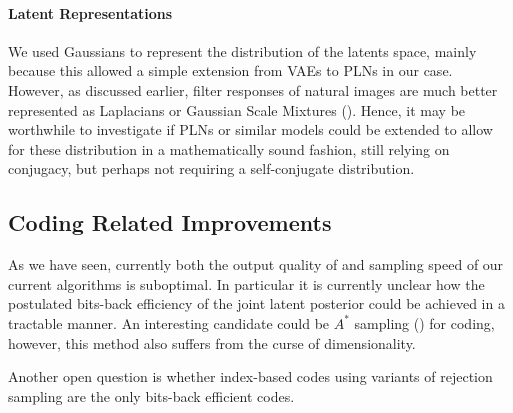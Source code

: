 \paragraph{Latent Representations}
We used Gaussians to represent the distribution of the latents space, mainly
because this allowed a simple extension from VAEs to PLNs in our case. However,
as discussed earlier, filter responses of natural images are much better
represented as Laplacians or Gaussian Scale Mixtures (\cite{portilla2003image}).
Hence, it may be worthwhile to investigate if PLNs or similar models could be
extended to allow for these distribution in a mathematically sound fashion,
still relying on conjugacy, but perhaps not requiring a self-conjugate distribution.

\subsection{Coding Related Improvements}
\par
As we have seen, currently both the output quality of and sampling speed of our
current algorithms is suboptimal. In particular it is currently unclear how the
postulated bits-back efficiency of the joint latent posterior could be achieved
in a tractable manner. An interesting candidate could be $A^*$ sampling
(\cite{maddison2014sampling}) for coding, however, this method also suffers from
the curse of dimensionality.

\par
Another open question is whether index-based codes using variants of rejection
sampling are the only bits-back efficient codes.